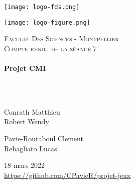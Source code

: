 \documentclass[a4paper, 12pt]{article}
\begin{document}
\begin{titlepage}
  \begin{sffamily}
  \begin{center}
  

\begin{minipage}[c]{.46\linewidth}
     \begin{center}
             \texttt{[image: logo-fds.png]}
         \end{center}
   \end{minipage} \hfill
   \begin{minipage}[c]{.46\linewidth}
    \begin{center}
            \texttt{[image: logo-figure.png]}
        \end{center}
 \end{minipage}
    \newline \newline

    \textsc{\LARGE Faculté Des Sciences - Montpellier}\\[2cm]

    \textsc{\Large Compte rendu de la séance 7}\\[1.5cm]

    \HRule \\[0.4cm]
    { \huge \bfseries Projet CMI\\[0.4cm] }

    \HRule \\[2cm]
    \\[2cm]

    \begin{minipage}{0.4\textwidth}
      \begin{flushleft} \large
        Conrath Matthieu\\
        Robert Wendy\\
      \end{flushleft}
    \end{minipage}
    \begin{minipage}{0.4\textwidth}
      \begin{flushright} \large
       Pavie-Routaboul Clement\\
        Rebagliato Lucas\\
      \end{flushright}
    \end{minipage}

    \vfill
    {\large 18 mars 2022}
    \\
    {\url{https://github.com/CPavieR/projet-jeux}}

  \end{center}
  \end{sffamily}
\end{titlepage}
\end{document}

